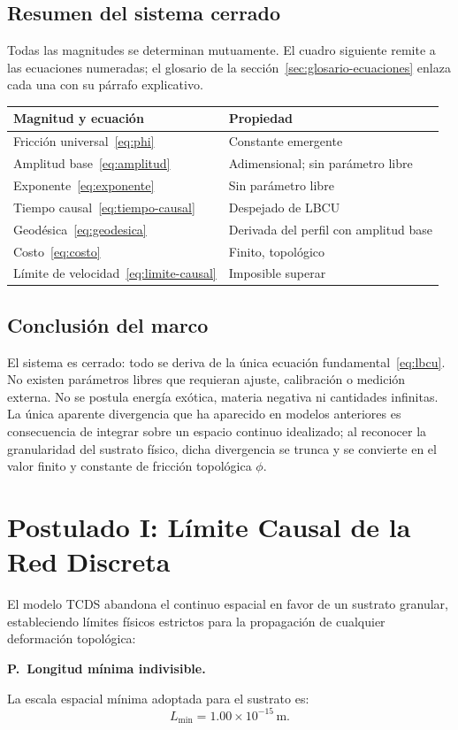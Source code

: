\documentclass[10pt,a4paper,twocolumn]{article}
\newcounter{parrafoecuacion}
\newcommand{\parrafoecuacion}[2]{%
    \par\smallskip\Needspace{6\baselineskip}%
    \noindent\refstepcounter{parrafoecuacion}\label{#1}%
    \textbf{P\theparrafoecuacion.\ #2.}\enspace
}
\begin{document}
\subsection{Resumen del sistema cerrado}
Todas las magnitudes se determinan mutuamente. El cuadro siguiente remite a las ecuaciones numeradas; el glosario de la sección~\ref{sec:glosario-ecuaciones} enlaza cada una con su párrafo explicativo.
\begin{center}
    \small
    \setlength{\tabcolsep}{3pt}
    \begin{tabularx}{\linewidth}{@{}>{\raggedright\arraybackslash}X >{\raggedright\arraybackslash}X@{}}
        \toprule
        Magnitud y ecuación & Propiedad\\
        \midrule
        Fricción universal~\eqref{eq:phi} & Constante emergente\\
        Amplitud base~\eqref{eq:amplitud} & Adimensional; sin parámetro libre\\
        Exponente~\eqref{eq:exponente} & Sin parámetro libre\\
        Tiempo causal~\eqref{eq:tiempo-causal} & Despejado de LBCU\\
        Geodésica~\eqref{eq:geodesica} & Derivada del perfil con amplitud base\\
        Costo~\eqref{eq:costo} & Finito, topológico\\
        Límite de velocidad~\eqref{eq:limite-causal} & Imposible superar\\
        \bottomrule
    \end{tabularx}
\end{center}

\subsection{Conclusión del marco}
El sistema es cerrado: todo se deriva de la única ecuación fundamental~\eqref{eq:lbcu}. No existen parámetros libres que requieran ajuste, calibración o medición externa. No se postula energía exótica, materia negativa ni cantidades infinitas. La única aparente divergencia que ha aparecido en modelos anteriores es consecuencia de integrar sobre un espacio continuo idealizado; al reconocer la granularidad del sustrato físico, dicha divergencia se trunca y se convierte en el valor finito y constante de fricción topológica $\phi$.

\section{Postulado I: Límite Causal de la Red Discreta}
El modelo TCDS abandona el continuo espacial en favor de un sustrato granular, estableciendo límites físicos estrictos para la propagación de cualquier deformación topológica:
\parrafoecuacion{par:longitud-minima}{Longitud mínima indivisible}
La escala espacial mínima adoptada para el sustrato es:
\begin{equation}
    L_{\text{min}} = 1.00 \times 10^{-15}\,\mathrm{m}.
    \label{eq:longitud-minima}
\end{equation}
\end{document}
